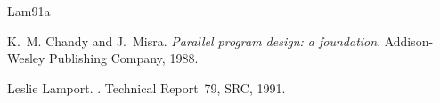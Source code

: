 \documentclass[11pt]{thesul}
\begin{document}
\twocolumn
\PrintGlossary

\PrintIndex

\onecolumn



%
%

\begin{thebibliography}{Lam91a}

K.~M. Chandy and J.~Misra.
\newblock \emph{Parallel program design: a foundation}.
\newblock Addison-Wesley Publishing Company, 1988.

Leslie Lamport.
.
\newblock Technical Report~79, SRC, 1991.

\end{thebibliography}

\end{document}

